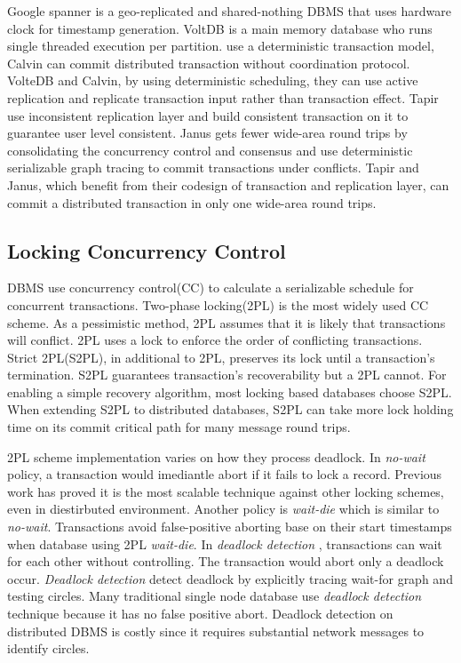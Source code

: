 \documentclass[conference]{IEEEtran}
\begin{document}
Google spanner \cite{Spanner:conf/osdi/CorbettDEFFFGGHHHKKLLMMNQRRSSTWW12}\cite{Spanner:conf/sigmod/BaconBBCDFFGJKL17} is a geo-replicated and shared-nothing DBMS that uses hardware clock for timestamp generation.
VoltDB \cite{VoltDB} is a main memory database who runs single threaded execution per partition.
\cite{Calvin:conf/sigmod/ThomsonDWRSA12} use a deterministic transaction model, 
Calvin can commit distributed transaction without coordination protocol.
VolteDB and Calvin, by using deterministic scheduling, they can use active replication and replicate transaction input rather than transaction effect.
Tapir\cite{Tapir:conf/sosp/ZhangSSKP15} use inconsistent replication layer and build consistent transaction on it to guarantee user level consistent.
Janus\cite{Janus:conf/osdi/MuNLL16} gets fewer wide-area  round trips 
by consolidating the concurrency control and consensus
and use deterministic serializable graph tracing to commit transactions under conflicts.
Tapir and Janus, which benefit from their codesign of transaction and replication layer, can commit a distributed transaction in only one wide-area round trips.

\subsection{Locking Concurrency Control}
DBMS use concurrency control(CC) to calculate a serializable schedule for concurrent transactions.
Two-phase locking(2PL) is the most widely used CC scheme.
As a pessimistic method, 2PL assumes that it is likely that transactions will conflict.
2PL uses a lock to enforce the order of conflicting transactions.
Strict 2PL(S2PL), in additional to 2PL, preserves its lock until a transaction's termination.
S2PL guarantees transaction's recoverability but a 2PL cannot.
For enabling a simple recovery algorithm, most locking based databases choose S2PL.
When extending S2PL to distributed databases, S2PL can take more lock holding time on its commit critical path for many message round trips.

2PL scheme implementation  varies on how they process deadlock.
In \emph{no-wait}
\cite{EvaluationOfCC:journals/pvldb/HardingAPS17}
policy, a transaction would imediantle abort if it fails to lock a record. 
Previous work has proved it is the most scalable technique against other locking schemes, even in diestirbuted environment\cite{EvaluationCC1000Cores:journals/pvldb/YuBPDS14}\cite{EvaluationOfCC:journals/pvldb/HardingAPS17}.
Another policy is \emph{wait-die} \cite{LockNoWait:journals/csur/BernsteinG81} which is similar to \emph{no-wait}.
Transactions avoid false-positive aborting base on their start timestamps when database using 2PL \emph{wait-die}.
In \emph{deadlock detection} \cite{LockCC:conf/ds/GrayLPT76},
transactions can wait for each other without controlling.
The transaction would abort only a deadlock occur.
\emph{Deadlock detection} detect deadlock by explicitly tracing wait-for graph and testing circles.
Many traditional single node database\cite{MySQL}\cite{PostgreSQL} use \emph{deadlock detection} technique because it has no false positive abort. 
Deadlock detection on distributed DBMS  is costly since it requires substantial network messages to identify circles.
\end{document}

